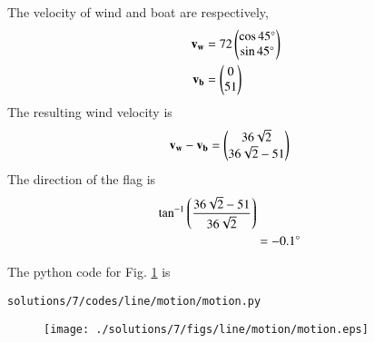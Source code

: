 The velocity of wind and  boat are respectively, 
\begin{align}
\mathbf{v_w} &= 72\begin{pmatrix}\cos45\degree\\ \sin45\degree\end{pmatrix} \\
\mathbf{v_b} &= \begin{pmatrix}0\\51\end{pmatrix}
\end{align} 
The resulting wind velocity is
\begin{align}
\mathbf{v_w}-\mathbf{v_b} 
&= \begin{pmatrix}36\sqrt{2}\\36\sqrt{2}-51\end{pmatrix}
\end{align}
The direction of the flag is 
\begin{align}
\tan^{-1}\left(\frac{36\sqrt{2}-51}{36\sqrt{2}}\right)\\
&= -0.1\degree
\end{align}

 The python code for Fig. \ref{fig:3.7.7}
is 
\begin{lstlisting}
solutions/7/codes/line/motion/motion.py
\end{lstlisting}
\begin{figure}[!ht]
\centering
\texttt{[image: ./solutions/7/figs/line/motion/motion.eps]}
\caption{}
\label{fig:3.7.7}
\end{figure}

